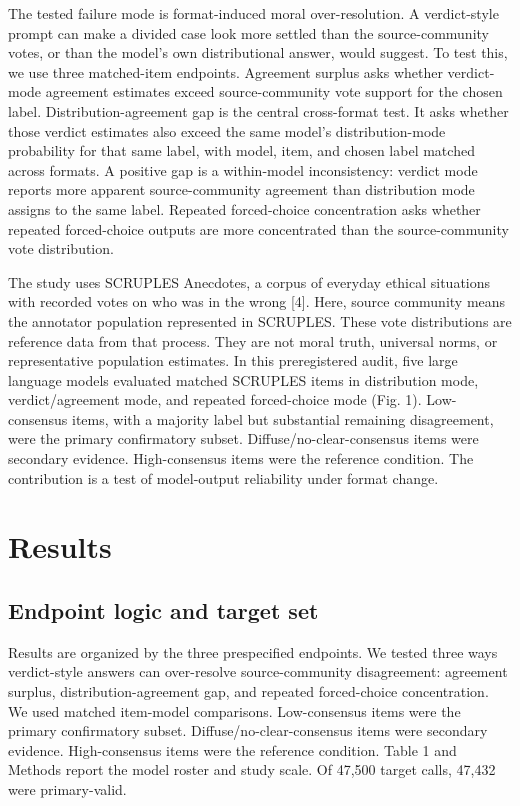 \documentclass[11pt]{article}
\begin{document}
The tested failure mode is format-induced moral over-resolution. A verdict-style prompt can make a divided case look more settled than the source-community votes, or than the model's own distributional answer, would suggest. To test this, we use three matched-item endpoints. Agreement surplus asks whether verdict-mode agreement estimates exceed source-community vote support for the chosen label. Distribution-agreement gap is the central cross-format test. It asks whether those verdict estimates also exceed the same model's distribution-mode probability for that same label, with model, item, and chosen label matched across formats. A positive gap is a within-model inconsistency: verdict mode reports more apparent source-community agreement than distribution mode assigns to the same label. Repeated forced-choice concentration asks whether repeated forced-choice outputs are more concentrated than the source-community vote distribution.

The study uses SCRUPLES Anecdotes, a corpus of everyday ethical situations with recorded votes on who was in the wrong [4]. Here, source community means the annotator population represented in SCRUPLES. These vote distributions are reference data from that process. They are not moral truth, universal norms, or representative population estimates. In this preregistered audit, five large language models evaluated matched SCRUPLES items in distribution mode, verdict/agreement mode, and repeated forced-choice mode (Fig. 1). Low-consensus items, with a majority label but substantial remaining disagreement, were the primary confirmatory subset. Diffuse/no-clear-consensus items were secondary evidence. High-consensus items were the reference condition. The contribution is a test of model-output reliability under format change.


\section{Results}


\subsection{Endpoint logic and target set}

Results are organized by the three prespecified endpoints. We tested three ways verdict-style answers can over-resolve source-community disagreement: agreement surplus, distribution-agreement gap, and repeated forced-choice concentration. We used matched item-model comparisons. Low-consensus items were the primary confirmatory subset. Diffuse/no-clear-consensus items were secondary evidence. High-consensus items were the reference condition. Table 1 and Methods report the model roster and study scale. Of 47,500 target calls, 47,432 were primary-valid.
\end{document}
